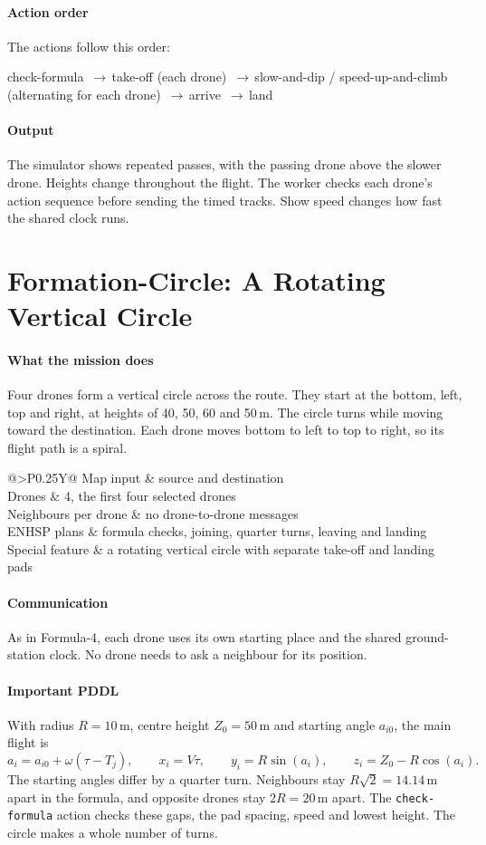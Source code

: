 \documentclass[11pt,a4paper,oneside]{report}
\makeatletter
\newcommand{\code}[1]{\texttt{#1}}
\newcommand{\glancebox}[2]{%
  \begin{tcolorbox}[enhanced,colback=softblue!45,colframe=navy,coltitle=white,
      fonttitle=\bfseries\small,title={#1},boxrule=0.6pt,arc=2pt,
      left=6pt,right=6pt,top=3pt,bottom=3pt,before skip=8pt,after skip=10pt]
    \small\setstretch{1.1}%
    \begin{tabularx}{\linewidth}{@{}>{\bfseries}P{0.25\linewidth}Y@{}}#2\end{tabularx}
  \end{tcolorbox}}
\newcommand{\then}{\,{\color{amber!80!black}$\boldsymbol{\rightarrow}$}\allowbreak\,}
\newcommand{\actionflow}[1]{%
  \par\begin{tcolorbox}[colback=codebg,colframe=coderule,boxrule=0.4pt,arc=2pt,
      left=5pt,right=5pt,top=2pt,bottom=2pt,before skip=6pt,after skip=8pt]
    \footnotesize\ttfamily\raggedright\setstretch{1.25}#1
  \end{tcolorbox}}
\makeatother
\begin{document}
\paragraph{Action order} The actions follow this order:
\actionflow{check-formula \then take-off (each drone) \then slow-and-dip / speed-up-and-climb
(alternating for each drone) \then arrive \then land}

\paragraph{Output}
The simulator shows repeated passes, with the passing drone above the slower drone. Heights
change throughout the flight. The worker checks each drone's action sequence before sending
the timed tracks. Show speed changes how fast the shared clock runs.

\section{Formation-Circle: A Rotating Vertical Circle}\label{sec:plan-circle}
\paragraph{What the mission does}
Four drones form a vertical circle across the route. They start at the bottom, left, top and
right, at heights of 40, 50, 60 and 50\,m. The circle turns while moving toward the destination.
Each drone moves bottom to left to top to right, so its flight path is a spiral.

\glancebox{At a glance: Formation-Circle}{
Map input & source and destination \\
Drones & 4, the first four selected drones \\
Neighbours per drone & no drone-to-drone messages \\
ENHSP plans & formula checks, joining, quarter turns, leaving and landing \\
Special feature & a rotating vertical circle with separate take-off and landing pads \\}

\paragraph{Communication}
As in Formula-4, each drone uses its own starting place and the shared ground-station clock.
No drone needs to ask a neighbour for its position.

\paragraph{Important PDDL}
With radius $R=10$\,m, centre height $Z_0=50$\,m and starting angle $a_{i0}$, the main flight is
\[
 a_i=a_{i0}+\omega(\tau-T_j),\qquad
 x_i=V\tau,\qquad y_i=R\sin(a_i),\qquad z_i=Z_0-R\cos(a_i).
\]
The starting angles differ by a quarter turn. Neighbours stay $R\sqrt{2}=14.14$\,m apart in
the formula, and opposite drones stay $2R=20$\,m apart. The \code{check-formula} action checks
these gaps, the pad spacing, speed and lowest height. The circle makes a whole number of turns.
\end{document}
